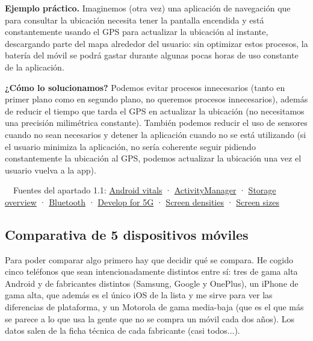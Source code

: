 \documentclass[11pt,a4paper]{article}
\newcommand{\campo}[1]{\textbf{\color{ink}#1}}
\begin{document}
	\campo{Ejemplo práctico.}
	Imaginemos (otra vez) una aplicación de navegación que para consultar la ubicación necesita tener la pantalla encendida y está constantemente usando el GPS para actualizar la ubicación al instante, descargando parte del mapa alrededor del usuario: sin optimizar estos procesos, la batería del móvil se podrá gastar durante algunas pocas horas de uso constante de la aplicación.
	
	\campo{¿Cómo lo solucionamos?}
	Podemos evitar procesos innecesarios (tanto en primer plano como en segundo plano, no queremos procesos innecesarios), además de reducir el tiempo que tarda el GPS en actualizar la ubicación (no necesitamos una precisión milimétrica constante). También podemos reducir el uso de sensores cuando no sean necesarios y detener la aplicación cuando no se está utilizando (si el usuario minimiza la aplicación, no sería coherente seguir pidiendo constantemente la ubicación al GPS, podemos actualizar la ubicación una vez el usuario vuelva a la app).
	
	\begin{fuentesbox}
		\color{muted}\faBook\ \ Fuentes del apartado 1.1:
		\href{https://developer.android.com/topic/performance/vitals}{Android vitals} ·
		\href{https://developer.android.com/reference/android/app/ActivityManager}{ActivityManager} ·
		\href{https://developer.android.com/training/data-storage}{Storage overview} ·
		\href{https://developer.android.com/develop/connectivity/bluetooth}{Bluetooth} ·
		\href{https://developer.android.com/develop/connectivity/5g}{Develop for 5G} ·
		\href{https://developer.android.com/training/multiscreen/screendensities}{Screen densities} ·
		\href{https://developer.android.com/training/multiscreen/screensizes}{Screen sizes}
	\end{fuentesbox}
	
	\subsection{Comparativa de 5 dispositivos móviles}
	
	Para poder comparar algo primero hay que decidir qué se compara. He cogido cinco teléfonos que sean intencionadamente distintos entre sí: tres de gama alta Android y de fabricantes distintos (Samsung, Google y OnePlus), un iPhone de gama alta, que además es el único iOS de la lista y me sirve para ver las diferencias de plataforma, y un Motorola de gama media-baja (que es el que más se parece a lo que usa la gente que no se compra un móvil cada dos años). Los datos salen de la ficha técnica de cada fabricante (casi todos...).
	
\end{document}
